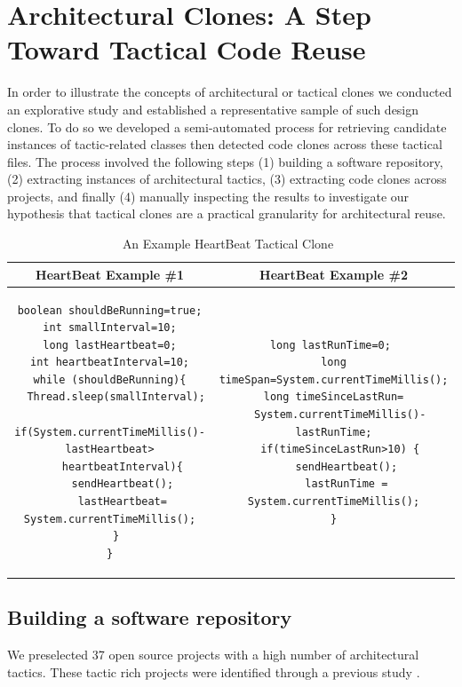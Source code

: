 \section{Architectural Clones: A Step Toward Tactical Code Reuse}
In order to illustrate the concepts of architectural or tactical clones we conducted an explorative study and established a representative sample of such design clones. To do so we developed a semi-automated process for retrieving candidate instances of tactic-related classes then detected code clones across these tactical files. The process involved the following steps (1) building a software repository, (2) extracting instances of architectural tactics, (3) extracting code clones across projects,  and finally (4) manually inspecting the results to investigate our hypothesis that tactical clones are a practical granularity for architectural reuse.

\noindent
\begin{table}[ht]
\vspace{-2pt}
\caption{An Example HeartBeat Tactical Clone~\label{table:heartbeedexample}}
\centering
\begin{tabular}{c | c}
\bfseries HeartBeat Example \#1  & \bfseries HeartBeat Example \#2  \\ \hline \hline
\begin{lstlisting}
boolean shouldBeRunning=true;
int smallInterval=10;
long lastHeartbeat=0;
int heartbeatInterval=10;
while (shouldBeRunning){
  Thread.sleep(smallInterval);
  if(System.currentTimeMillis()-lastHeartbeat>
    heartbeatInterval){
    sendHeartbeat();
    lastHeartbeat= System.currentTimeMillis();
  }
}
\end{lstlisting}
&
\begin{lstlisting}
long lastRunTime=0;	
long timeSpan=System.currentTimeMillis();
long timeSinceLastRun=
  System.currentTimeMillis()-lastRunTime;
  if(timeSinceLastRun>10) {
    sendHeartbeat();
	lastRunTime = System.currentTimeMillis();
}
\end{lstlisting}

\end{tabular}
\vspace{-2pt}
\end{table}
\vspace{-8pt}

\subsection{Building a software repository}
We preselected 37 open source projects with a high number of architectural tactics. These tactic rich projects were identified through a previous study \cite{FSE2014}.


